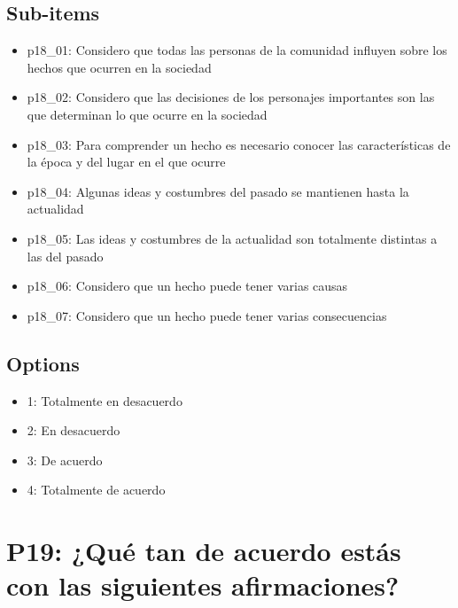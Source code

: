 \documentclass[11pt]{article}
\begin{document}
\subsection*{Sub-items}
\begin{itemize}[leftmargin=*]
  \item p18\_01: Considero que todas las personas de la comunidad influyen sobre los hechos que ocurren en la sociedad
  \item p18\_02: Considero que las decisiones de los personajes importantes son las que determinan lo que ocurre en la sociedad
  \item p18\_03: Para comprender un hecho es necesario conocer las características de la época y del lugar en el que ocurre
  \item p18\_04: Algunas ideas y costumbres del pasado se mantienen hasta la actualidad
  \item p18\_05: Las ideas y costumbres de la actualidad son totalmente distintas a las del pasado
  \item p18\_06: Considero que un hecho puede tener varias causas
  \item p18\_07: Considero que un hecho puede tener varias consecuencias
\end{itemize}
\subsection*{Options}
\begin{itemize}[leftmargin=*]
  \item 1: Totalmente en desacuerdo
  \item 2: En desacuerdo
  \item 3: De acuerdo
  \item 4: Totalmente de acuerdo
\end{itemize}
\bigskip
\section*{P19: ¿Qué tan de acuerdo estás con las siguientes afirmaciones?}
\end{document}

